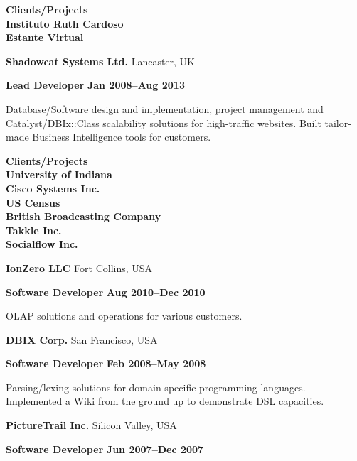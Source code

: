 \documentclass[a4paper,oneside]{memoir}
\begin{document}
\begin{multicols}{2}
\begin{flushleft}
\footnotesize\textbf{\color{RoyalBlue}Clients/Projects}\\
\textbf{Instituto Ruth Cardoso}\\
\textbf{Estante Virtual}\\

\normalsize

\textbf{\color{RoyalBlue}Shadowcat Systems Ltd.} \footnotesize Lancaster, UK\normalsize

\textbf{Lead Developer}
\footnotesize\textbf{Jan 2008--Aug 2013}\normalsize

\scriptsize

Database/Software design and implementation, project management and
Catalyst/DBIx::Class scalability solutions for high-traffic websites. Built
tailor-made Business Intelligence tools for customers.

\footnotesize\textbf{\color{RoyalBlue}Clients/Projects}\\
\textbf{University of Indiana}\\
\textbf{Cisco Systems Inc.}\\
\textbf{US Census}\\
\textbf{British Broadcasting Company}\\
\textbf{Takkle Inc.}\\
\textbf{Socialflow Inc.}\\

\normalsize

\textbf{\color{RoyalBlue}IonZero LLC} \footnotesize Fort Collins, USA\normalsize

\textbf{Software Developer}
\footnotesize\textbf{Aug 2010--Dec 2010}\normalsize

\scriptsize

OLAP solutions and operations for various customers.

\normalsize

\textbf{\color{RoyalBlue}DBIX Corp.} \footnotesize San Francisco, USA\normalsize

\textbf{Software Developer}
\footnotesize\textbf{Feb 2008--May 2008}\normalsize

\scriptsize

Parsing/lexing solutions for domain-specific programming languages. Implemented
a Wiki from the ground up to demonstrate DSL capacities.

\normalsize

\textbf{\color{RoyalBlue}PictureTrail Inc.} \footnotesize Silicon Valley, USA\normalsize

\textbf{Software Developer}
\footnotesize\textbf{Jun 2007--Dec 2007}\normalsize


\end{flushleft}
\end{multicols}
\end{document}
